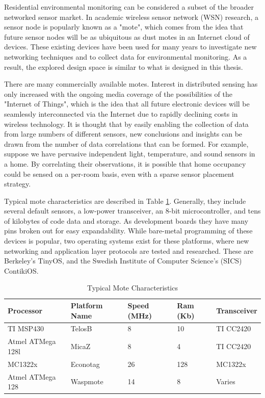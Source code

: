 Residential environmental monitoring can be considered a subset of the broader networked sensor market. In academic wireless sensor network (WSN) research, a sensor node is popularly known as a "mote", which comes from the idea that future sensor nodes will be as ubiquitous as dust motes in an Internet cloud of devices. These existing devices have been used for many years to investigate new networking techniques and to collect data for environmental monitoring. As a result, the explored design space is similar to what is designed in this thesis. 

There are many commercially available motes. Interest in distributed sensing has only increased with the ongoing media coverage of the possibilities of the "Internet of Things", which is the idea that all future electronic devices will be seamlessly interconnected via the Internet due to rapidly declining costs in wireless technology. It is thought that by easily enabling the collection of data from large numbers of different sensors, new conclusions and insights can be drawn from the number of data correlations that can be formed. For example, suppose we have pervasive independent light, temperature, and sound sensors in a home. By correlating their observations, it is possible that home occupancy could be sensed on a per-room basis, even with a sparse sensor placement strategy.

Typical mote characteristics are described in Table \ref{mote_characteristics}. Generally, they include several default sensors, a low-power transceiver, an 8-bit microcontroller, and tens of kilobytes of code data and storage. As development boards they have many pins broken out for easy expandability. While bare-metal programming of these devices is popular, two operating systems exist for these platforms, where new networking and application layer protocols are tested and researched. These are Berkeley's TinyOS\cite{levis2005tinyos}, and the Swedish Institute of Computer Science's (SICS) ContikiOS\cite{dunkels2011contiki}. 

\begin{table}[h]
\begin{tabular}{@{}lllll@{}}
\toprule
Processor & Platform Name & Speed (MHz) & Ram (Kb) & Transceiver \\ \midrule
TI MSP430 & TelosB & 8 & 10 & TI CC2420 \\
Atmel ATMega 128l & MicaZ & 8 & 4 & TI CC2420 \\
MC1322x & Econotag & 26 & 128 & MC1322x \\
Atmel ATMega 128 & Waspmote & 14 & 8 & Varies \\ \bottomrule
\end{tabular}
\caption{Typical Mote Characteristics}
\label{mote_characteristics}
\end{table}

